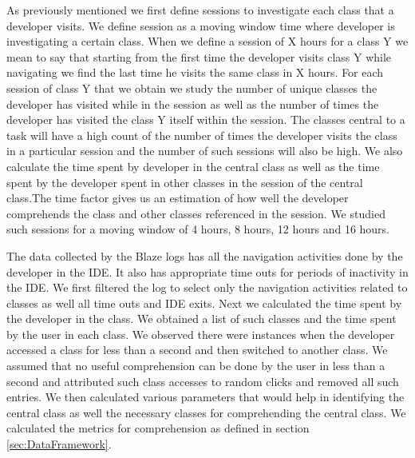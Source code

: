 As previously mentioned we first define sessions to investigate each class that a developer visits. We define session as a moving window time where developer is investigating a certain class. 
When we define a session of X hours for a class Y we mean to say that starting from the first time the developer visits class Y while navigating we find the last time he visits the same class in X hours. For each session of class Y that we obtain we study the number of unique classes the developer has visited while in the session as well as the number of times the developer has visited the class Y itself within the session. 
The classes central to a task will have a high count of the number of times the developer visits the class in a particular session and the number of such sessions will also be high. We also calculate the time spent by developer in the central class as well as the time spent by the developer spent in other classes in the session of the central class.The time factor gives us an estimation of how well the developer comprehends the class and other classes referenced in the session. We studied such sessions for a moving window of 4 hours, 8 hours, 12 hours and 16 hours. 

The data collected by the Blaze logs has all the navigation activities done by the developer in the IDE. It also has appropriate time outs for periods of inactivity in the IDE. We first filtered the log to select only the navigation activities related to classes as well all time outs and IDE exits. Next we calculated the time spent by the developer in the class. We obtained a list of such classes and the time spent by the user in each class. We observed there were instances when the developer accessed a class for less than a second and then switched to another class. We assumed that no useful comprehension can be done by the user in less than a second and attributed such class accesses to random clicks and removed all such entries. We then calculated various parameters that would help in identifying the central class as well the necessary classes for comprehending the central class.   We calculated the metrics for comprehension as defined in section \ref{sec:DataFramework}.

